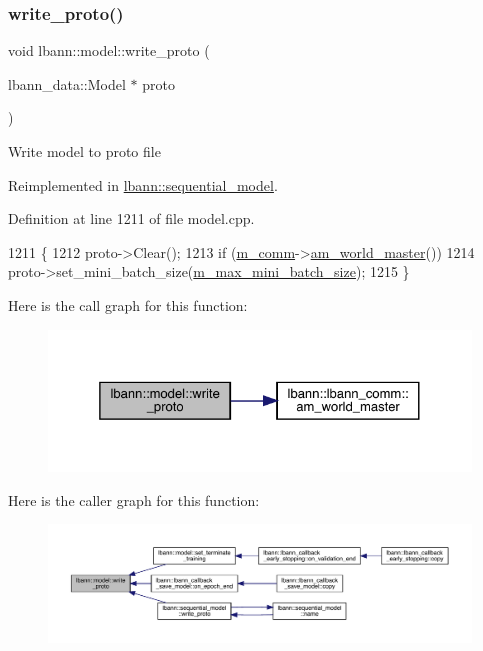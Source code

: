 \subsubsection{\texorpdfstring{write\+\_\+proto()}{write\_proto()}}
{\footnotesize\ttfamily void lbann\+::model\+::write\+\_\+proto (\begin{DoxyParamCaption}\item[{lbann\+\_\+data\+::\+Model $\ast$}]{proto }\end{DoxyParamCaption})\hspace{0.3cm}{\ttfamily [virtual]}}

Write model to proto file 

Reimplemented in \hyperlink{classlbann_1_1sequential__model_a53a83327a1115a53affa78c93344e641}{lbann\+::sequential\+\_\+model}.



Definition at line 1211 of file model.\+cpp.


\begin{DoxyCode}
1211                                               \{
1212   proto->Clear();
1213   \textcolor{keywordflow}{if} (\hyperlink{classlbann_1_1model_a0eabaf2b2f829fd5db3dfd26df420df0}{m\_comm}->\hyperlink{classlbann_1_1lbann__comm_a1ef526486183a29feadca9bef096a534}{am\_world\_master}()) 
1214     proto->set\_mini\_batch\_size(\hyperlink{classlbann_1_1model_acc496503e7cf8d635e5a31ba09b3c81a}{m\_max\_mini\_batch\_size});
1215 \}
\end{DoxyCode}
Here is the call graph for this function\+:\nopagebreak
\begin{figure}[H]
\begin{center}
\leavevmode
\includegraphics[width=325pt]{classlbann_1_1model_a488da86420421a4890c8fd7a95849acc_cgraph}
\end{center}
\end{figure}
Here is the caller graph for this function\+:\nopagebreak
\begin{figure}[H]
\begin{center}
\leavevmode
\includegraphics[width=350pt]{classlbann_1_1model_a488da86420421a4890c8fd7a95849acc_icgraph}
\end{center}
\end{figure}


